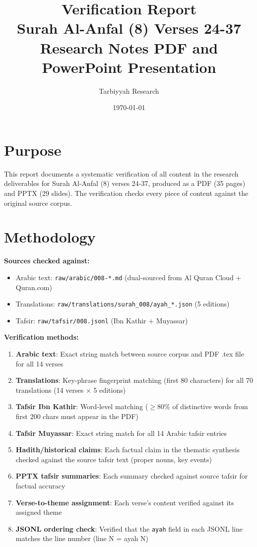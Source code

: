 \documentclass[11pt,a4paper]{article}
\title{\textbf{\color{primary} Verification Report}\\[0.3cm]
\large Surah Al-Anfal (8) Verses 24-37\\
\normalsize Research Notes PDF and PowerPoint Presentation}
\author{Tarbiyyah Research}
\date{\today}
\begin{document}
\maketitle
\thispagestyle{empty}

\section*{Purpose}

This report documents a systematic verification of all content in the research deliverables for Surah Al-Anfal (8) verses 24-37, produced as a PDF (35 pages) and PPTX (29 slides). The verification checks every piece of content against the original source corpus.

\section*{Methodology}

\begin{infobox}
\textbf{Sources checked against:}
\begin{itemize}
\item Arabic text: \texttt{raw/arabic/008-*.md} (dual-sourced from Al Quran Cloud + Quran.com)
\item Translations: \texttt{raw/translations/surah\_008/ayah\_*.json} (5 editions)
\item Tafsir: \texttt{raw/tafsir/008.jsonl} (Ibn Kathir + Muyassar)
\end{itemize}

\textbf{Verification methods:}
\begin{enumerate}
\item \textbf{Arabic text}: Exact string match between source corpus and PDF .tex file for all 14 verses
\item \textbf{Translations}: Key-phrase fingerprint matching (first 80 characters) for all 70 translations (14 verses $\times$ 5 editions)
\item \textbf{Tafsir Ibn Kathir}: Word-level matching ($\geq$80\% of distinctive words from first 200 chars must appear in the PDF)
\item \textbf{Tafsir Muyassar}: Exact string match for all 14 Arabic tafsir entries
\item \textbf{Hadith/historical claims}: Each factual claim in the thematic synthesis checked against the source tafsir text (proper nouns, key events)
\item \textbf{PPTX tafsir summaries}: Each summary checked against source tafsir for factual accuracy
\item \textbf{Verse-to-theme assignment}: Each verse's content verified against its assigned theme
\item \textbf{JSONL ordering check}: Verified that the \texttt{ayah} field in each JSONL line matches the line number (line N = ayah N)
\end{enumerate}
\end{infobox}
\end{document}
